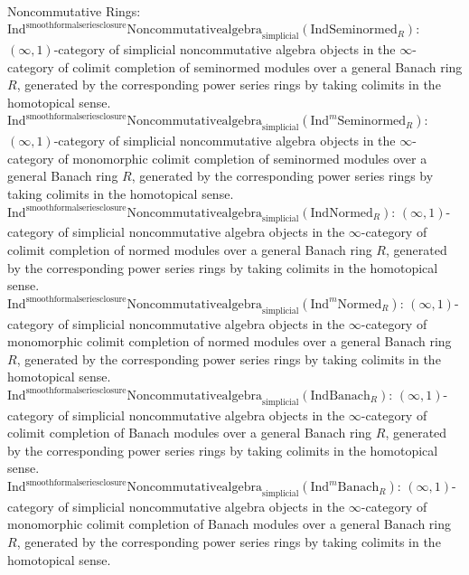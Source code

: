 \documentclass[11pt]{book}
\theoremstyle{definition}
\numberwithin{equation}{section}
\begin{document}
\


\newpage



\noindent Noncommutative Rings:\\

\noindent $\mathrm{Ind}^\text{smoothformalseriesclosure}\mathrm{Noncommutativealgebra}_{\mathrm{simplicial}}(\mathrm{Ind}\mathrm{Seminormed}_R)$: $(\infty,1)$-category of simplicial noncommutative algebra objects in the $\infty$-category of colimit completion of seminormed modules over a general Banach ring $R$, generated by the corresponding power series rings by taking colimits in the homotopical sense. \\ 
\noindent $\mathrm{Ind}^\text{smoothformalseriesclosure}\mathrm{Noncommutativealgebra}_{\mathrm{simplicial}}(\mathrm{Ind}^m\mathrm{Seminormed}_R)$: $(\infty,1)$-category of simplicial noncommutative algebra objects in the $\infty$-category of monomorphic colimit completion of seminormed modules over a general Banach ring $R$, generated by the corresponding power series rings by taking colimits in the homotopical sense. \\ 
\noindent $\mathrm{Ind}^\text{smoothformalseriesclosure}\mathrm{Noncommutativealgebra}_{\mathrm{simplicial}}(\mathrm{Ind}\mathrm{Normed}_R)$: $(\infty,1)$-category of simplicial noncommutative algebra objects in the $\infty$-category of colimit completion of normed modules over a general Banach ring $R$, generated by the corresponding power series rings by taking colimits in the homotopical sense. \\ 
\noindent $\mathrm{Ind}^\text{smoothformalseriesclosure}\mathrm{Noncommutativealgebra}_{\mathrm{simplicial}}(\mathrm{Ind}^m\mathrm{Normed}_R)$: $(\infty,1)$-category of simplicial noncommutative algebra objects in the $\infty$-category of monomorphic colimit completion of normed modules over a general Banach ring $R$, generated by the corresponding power series rings by taking colimits in the homotopical sense. \\ 
\noindent $\mathrm{Ind}^\text{smoothformalseriesclosure}\mathrm{Noncommutativealgebra}_{\mathrm{simplicial}}(\mathrm{Ind}\mathrm{Banach}_R)$: $(\infty,1)$-category of simplicial noncommutative algebra objects in the $\infty$-category of colimit completion of Banach modules over a general Banach ring $R$, generated by the corresponding power series rings by taking colimits in the homotopical sense. \\ 
\noindent $\mathrm{Ind}^\text{smoothformalseriesclosure}\mathrm{Noncommutativealgebra}_{\mathrm{simplicial}}(\mathrm{Ind}^m\mathrm{Banach}_R)$: $(\infty,1)$-category of simplicial noncommutative algebra objects in the $\infty$-category of monomorphic colimit completion of Banach modules over a general Banach ring $R$, generated by the corresponding power series rings by taking colimits in the homotopical sense. \\ 
\end{document}
